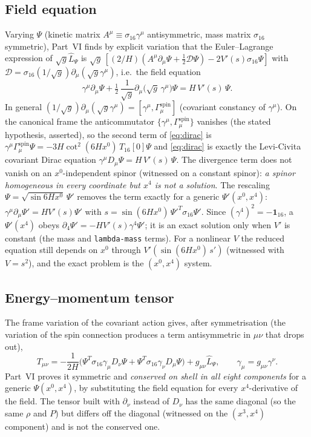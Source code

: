 \documentclass[11pt,a4paper]{article}
\newcommand{\Lhat}{\hat{L}}
\newcommand{\sig}{\sigma_{16}}
\newcommand{\T}[1]{T_{16}[#1]}
\newcommand{\sgn}{\sqrt{g}}
\begin{document}
\subsection{Field equation}

Varying $\Psi$ (kinetic matrix $A^\mu\equiv\sig\gamma^\mu$ antisymmetric, mass matrix $\sig$
symmetric), Part~VI finds by explicit variation that the Euler--Lagrange expression of
$\sgn\Lhat_\Psi$ is
$\sgn\,[(2/H)(A^\mu\partial_\mu\Psi+\tfrac12\mathcal{D}\Psi)-2V'(s)\sig\Psi]$ with
$\mathcal{D}=\sig(1/\sgn)\partial_\mu(\sgn\gamma^\mu)$, i.e.\ the field equation
\begin{equation}\label{eq:dirac}
  \gamma^\mu\partial_\mu\Psi+\tfrac12\,\frac{1}{\sgn}\partial_\mu\bigl(\sgn\,\gamma^\mu\bigr)\Psi
  =H\,V'(s)\,\Psi .
\end{equation}
In general $(1/\sgn)\partial_\mu(\sgn\gamma^\mu)=[\gamma^\mu,\Gamma^{\mathrm{spin}}_\mu]$ (covariant
constancy of $\gamma^\mu$). On the canonical frame the anticommutator
$\{\gamma^\mu,\Gamma^{\mathrm{spin}}_\mu\}$ vanishes (the stated hypothesis, asserted), so the
second term of \eqref{eq:dirac} is $\gamma^\mu\Gamma^{\mathrm{spin}}_\mu\Psi=-3H\cot^2(6Hx^0)\,\T{0}\Psi$
and \eqref{eq:dirac} is exactly the Levi-Civita covariant Dirac equation
$\gamma^\mu D_\mu\Psi=H\,V'(s)\,\Psi$. The divergence term does not vanish on an $x^0$-independent
spinor (witnessed on a constant spinor): \emph{a spinor homogeneous in every coordinate but $x^4$
is not a solution}. The rescaling $\Psi=\sqrt{\sin 6Hx^0}\,\Psi'$ removes the term exactly for a
generic $\Psi'(x^0,x^4)$: $\gamma^\mu\partial_\mu\Psi'=HV'(s)\Psi'$ with
$s=\sin(6Hx^0)\,\Psi'^{T}\sig\Psi'$. Since $(\gamma^4)^2=-\mathbf 1_{16}$, a $\Psi'(x^4)$ obeys
$\partial_4\Psi'=-HV'(s)\gamma^4\Psi'$; it is an exact solution only when $V'$ is constant (the
mass and \texttt{lambda-mass} terms). For a nonlinear $V$ the reduced equation still depends on
$x^0$ through $V'(\sin(6Hx^0)\,s')$ (witnessed with $V=s^2$), and the exact problem is the
$(x^0,x^4)$ system.

\subsection{Energy--momentum tensor}

The frame variation of the covariant action gives, after symmetrisation (the variation of the spin
connection produces a term antisymmetric in $\mu\nu$ that drops out),
\begin{equation}\label{eq:Tpsi}
  T_{\mu\nu}=-\frac{1}{2H}\bigl(\Psi^{T}\sig\gamma_\mu D_\nu\Psi+\Psi^{T}\sig\gamma_\nu D_\mu\Psi\bigr)
  +g_{\mu\nu}\Lhat_\Psi,\qquad \gamma_\mu=g_{\mu\nu}\gamma^\nu .
\end{equation}
Part~VI proves it symmetric and \emph{conserved on shell in all eight components} for a generic
$\Psi(x^0,x^4)$, by substituting the field equation for every $x^4$-derivative of the field. The
tensor built with $\partial_\nu$ instead of $D_\nu$ has the same diagonal (so the same $\rho$ and
$P$) but differs off the diagonal (witnessed on the $(x^3,x^4)$ component) and is not the
conserved one.
\end{document}
